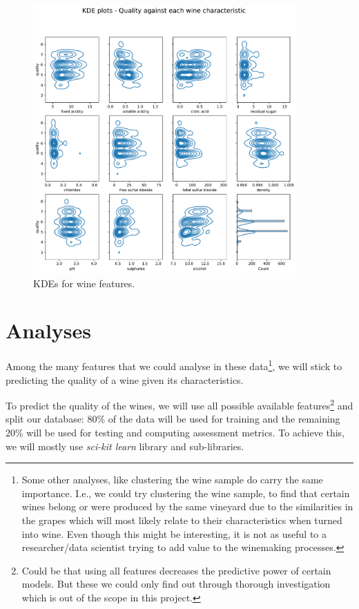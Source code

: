 \documentclass[11pt]{article}
\begin{document}
\begin{figure}[h!]
    \includegraphics[width=0.9\textwidth]{figs/wine_kde}
    \caption{KDEs for wine features.}
    \label{fig:wine_kdes}
\end{figure}


\section{Analyses}\label{sec:analyses}

Among the many features that we could analyse in these data\footnote{Some other analyses, like clustering the wine sample do
carry the same importance. I.e., we could try clustering the wine sample, to find that certain
wines belong or were produced by the same vineyard due to the similarities in the grapes which
will most likely relate to their characteristics when turned into wine.
Even though this might be interesting, it is not as useful to a researcher/data scientist trying to add value
to the winemaking processes.}, we will stick to predicting the quality
of a wine given its characteristics.

To predict the quality of the wines, we will use all possible available features\footnote{Could be that using all
features decreases the predictive power of certain models. But these we could only find out through thorough investigation
which is out of the scope in this project.} and split our database: 80\% of the data will be used for training and
the remaining 20\% will be used for testing and computing assessment metrics.
To achieve this, we will mostly use \emph{sci-kit learn} library and sub-libraries.
\end{document}
